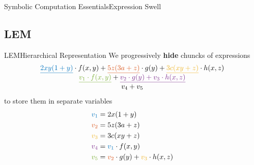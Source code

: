 \begin{frame}{Symbolic Computation Essentials}{Expression Swell}
{}
\end{frame}

\subsection{\acl{LEM}}

\begin{frame}{\acl{LEM}}{Hierarchical Representation}
  We progressively \textbf{hide} chuncks of expressions
  \begin{equation*}
    \begin{array}{c}
      \textcolor{mycolor1}{\underline{2xy(1+y)}} \cdot f(x,y) + \textcolor{mycolor2}{\underline{5z(3a+z)}} \cdot g(y) + \textcolor{mycolor3}{\underline{3c(xy+z)}} \cdot h(x,z) \\[0.1em]
      \textcolor{mycolor5}{\underline{v_1 \cdot f(x,y)}} + \textcolor{mycolor4}{\underline{v_2 \cdot g(y) + v_3 \cdot h(x,z)}} \\[0.1em]
      v_4 + v_5
    \end{array}
  \end{equation*}
  to store them in separate variables
  \begin{align*}
    \textcolor{mycolor1}{v_1} &= 2x(1+y) \\
    \textcolor{mycolor2}{v_2} &= 5z(3a+z) \\
    \textcolor{mycolor3}{v_3} &= 3c(xy+z) \\
    \textcolor{mycolor4}{v_4} &= \textcolor{mycolor1}{v_1} \cdot f(x,y) \\
    \textcolor{mycolor5}{v_5} &= \textcolor{mycolor2}{v_2} \cdot g(y) + \textcolor{mycolor3}{v_3} \cdot h(x,z)
  \end{align*}
\end{frame}


